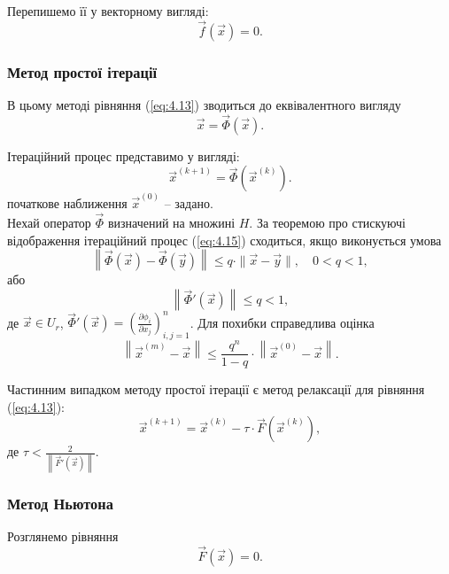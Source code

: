 Перепишемо її у векторному вигляді: 
\begin{equation}
	\label{eq:4.13}
	\vec f(\vec x) = 0.
\end{equation}

\subsubsection{Метод простої ітерації}

В цьому методі рівняння (\ref{eq:4.13}) зводиться до еквівалентного вигляду
\begin{equation}
	\label{eq:4.14}
	\vec x = \vec \Phi(\vec x).
\end{equation}

Ітераційний процес представимо у вигляді:
\begin{equation}
	\label{eq:4.15}
	\vec x^{(k+1)} = \vec \Phi\left(\vec x^{(k)}\right).
\end{equation}
початкове наближення $\vec x^{(0)}$ -- задано. \\

Нехай оператор $\vec \Phi$ визначений на множині $H$. За теоремою про стискуючі відображення ітераційний процес (\ref{eq:4.15}) сходиться, якщо виконується умова
\begin{equation}
	\label{eq:4.16}
	\left\| \vec \Phi(\vec x) - \vec \Phi(\vec y) \right\| \le q \cdot \|\vec x - \vec y\|, \quad 0 < q < 1, 
\end{equation}
або
\begin{equation}
	\label{eq:4.17}
	\left\| \vec \Phi'(\vec x)\right\| \le q < 1, 
\end{equation}
де $\vec x\in U_r$, $\vec \Phi'(\vec x) = \left(\frac{\partial \phi_i}{\partial x_j}\right)_{i,j=1}^n$. Для похибки справедлива оцінка
\[ \left\| \vec x^{(m)} - \vec x\right\| \le \dfrac{q^n}{1 - q} \cdot\left\|\vec x^{(0)} - \vec x\right\|.\]

Частинним випадком методу простої ітерації є метод релаксації для рівняння (\ref{eq:4.13}):
\[ \vec x^{(k+1)} = \vec x^{(k)} - \tau \cdot \vec F\left(\vec x^{(k)}\right), \]
де $\tau < \frac{2}{\left\|\vec F'(\vec x)\right\|}$.

\subsubsection{Метод Ньютона}

Розглянемо рівняння
\[ \vec F(\vec x) = 0. \]

